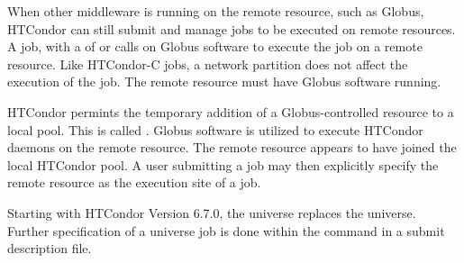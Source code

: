 When other middleware is running on the remote resource,
such as Globus,
HTCondor can still submit and manage jobs to be executed on
remote resources.
A   job,
with a  of
 or 
calls on Globus software to execute the job on a remote resource.
Like HTCondor-C jobs, a network partition does not affect
the execution of the job.
The remote resource must have Globus software running.

HTCondor permints the temporary addition of a
Globus-controlled resource to a local pool.
This is called .
Globus software is utilized to execute HTCondor daemons on the
remote resource.
The remote resource appears to have joined the local HTCondor pool.
A user submitting a job may then explicitly specify the
remote resource as the execution site of a job.

Starting with HTCondor Version 6.7.0, the  universe
replaces the  universe.
Further specification of a  universe job is done
within the  command in a submit description file.
